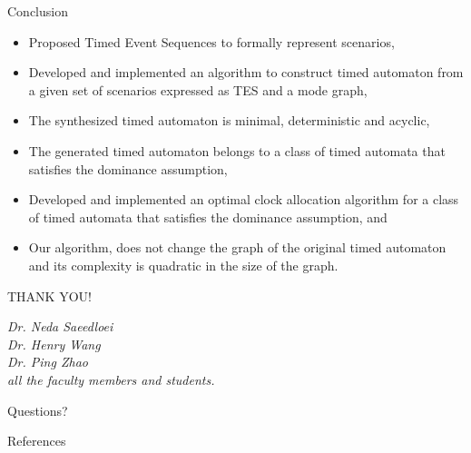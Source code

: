 \documentclass[10pt]{beamer}
\theoremstyle{plain}
\theoremstyle{definition}
\begin{document}
\begin{frame}{Conclusion}
	\begin{itemize}
		\item Proposed Timed Event Sequences to formally represent scenarios,
		\item Developed and implemented an algorithm to construct timed automaton  from a given set of scenarios expressed as TES and a mode graph,
		\item The synthesized timed automaton is minimal, deterministic and acyclic,
		\item The generated timed automaton belongs to a class of timed automata that satisfies the dominance assumption,
		\item Developed and implemented an optimal clock allocation algorithm for a class of timed automata that satisfies the dominance assumption, and
		\item Our algorithm, does not change the graph of the original timed automaton and its complexity is quadratic in the size of the graph.
	\end{itemize}
\end{frame}

\begin{frame}[standout]
\Huge THANK YOU! \\
\vspace{0.5cm}
\small

\emph{Dr. Neda Saeedloei}\\
\emph{Dr. Henry Wang}\\
\emph{Dr. Ping Zhao}\\
\emph{all the faculty members and students.}
\end{frame}

\begin{frame}[standout]
	Questions?
\end{frame}


\begin{frame}[allowframebreaks]{References}
	
	
\end{frame}
\end{document}
